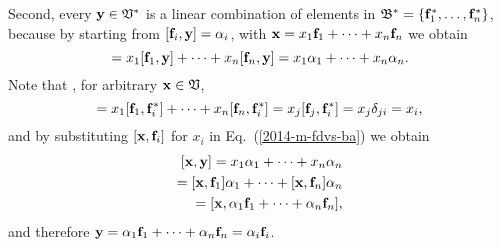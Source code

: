 {Second,  every ${\bf y} \in {\frak V}^*$ is a linear combination of elements in
${\frak B}^* = \{{\bf f}_1^*,\ldots , {\bf f}_n^*\}$, because by
starting from
$[{\bf f}_i,  {\bf y}]=\alpha_i$,
with
$ {\bf x} = x_1 {\bf f}_1 +\cdots + x_n {\bf f}_n$
we obtain
\begin{equation}
 [{\bf x},{\bf y}]
= x_1 [{\bf f}_1,{\bf y}] +\cdots + x_n [{\bf f}_n,{\bf y}]
= x_1 \alpha_1 +\cdots + x_n \alpha_n.
\label{2014-m-fdvs-ba}
\end{equation}
Note that , for arbitrary  ${\bf x}\in {\frak V}$,
\begin{equation}
 [{\bf x},{\bf f}_i^*]
= x_1 [{\bf f}_1,{\bf f}_i^*] +\cdots + x_n [{\bf f}_n,{\bf f}_i^*]=  x_j [{\bf f}_j,{\bf f}_i^*]=  x_j \delta_{ji}=  x_i,
\label{2014-m-ch-fdlvs-kju}
\end{equation}
and by substituting $[{\bf x},{\bf f}_i]$ for $x_i$ in Eq.~(\ref{2014-m-fdvs-ba}) we obtain
\begin{equation}
\begin{split}
 [{\bf x},{\bf y}] =
 x_1\alpha_1 +\cdots + x_n \alpha_n \\
= [{\bf x},{\bf f}_1] \alpha_1 +\cdots + [{\bf x},{\bf f}_n] \alpha_n  \\
= [{\bf x},\alpha_1 {\bf f}_1 +\cdots + \alpha_n{\bf f}_n] ,
\label{2014-m-fdvs-ba1}
\end{split}
\end{equation}
and therefore ${\bf y} =\alpha_1 {\bf f}_1 +\cdots + \alpha_n{\bf f}_n=\alpha_i{\bf f}_i$.

\eproof
}


